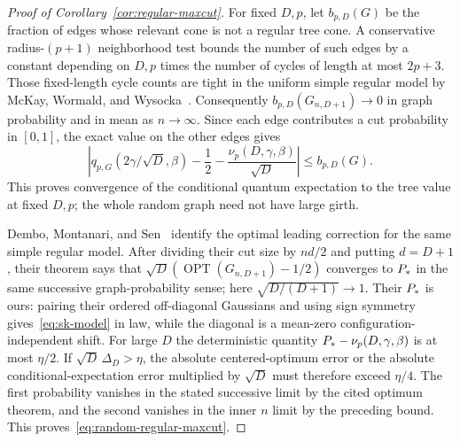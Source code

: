 \begin{proof}[Proof of Corollary~\ref{cor:regular-maxcut}]
For fixed $D,p$, let $b_{p,D}(G)$ be the fraction of edges whose relevant
cone is not a regular tree cone.  A conservative radius-$(p+1)$
neighborhood test bounds the number of such edges by a constant depending
on $D,p$ times the number of cycles of length at most $2p+3$.
Those fixed-length cycle counts are tight in the uniform simple regular
model by McKay, Wormald, and Wysocka~\cite[Theorem~1]{MWW2004}.
Consequently $b_{p,D}(G_{n,D+1})\to0$ in graph probability and in mean
as $n\to\infty$.  Since each edge contributes a cut probability in $[0,1]$,
the exact value on the other edges gives
\[
 \left|q_{p,G}(2\gamma/\sqrt D,\beta)
 -\frac12-\frac{\nu_p(D,\gamma,\beta)}{\sqrt D}\right|
 \le b_{p,D}(G).
\]
This proves convergence of the conditional quantum expectation to the
tree value at fixed $D,p$; the whole random graph need not have large
girth.

Dembo, Montanari, and Sen~\cite[Theorem~1.6(b), with the convention after
Equation~(1.7)]{DMS2017} identify the optimal leading correction for
the same simple regular model.  After dividing their cut size by $nd/2$
and putting $d=D+1$, their theorem says that
$\sqrt D(\operatorname{OPT}(G_{n,D+1})-1/2)$ converges to $P_*$ in
the same successive graph-probability sense; here
$\sqrt{D/(D+1)}\to1$.  Their $P_*$ is ours: pairing their ordered
off-diagonal Gaussians and using sign symmetry gives~\eqref{eq:sk-model}
in law, while the diagonal is a mean-zero configuration-independent
shift.  For large $D$ the deterministic quantity $P_*-\nu_p(D,\gamma,\beta)$
is at most $\eta/2$.  If $\sqrt D\,\Delta_D>\eta$, the absolute centered-optimum
error or the absolute conditional-expectation error multiplied by
$\sqrt D$ must therefore exceed $\eta/4$.  The first probability vanishes
in the stated successive limit by the cited optimum theorem, and the
second vanishes in the inner $n$ limit by the preceding bound.  This
proves~\eqref{eq:random-regular-maxcut}.
\end{proof}
